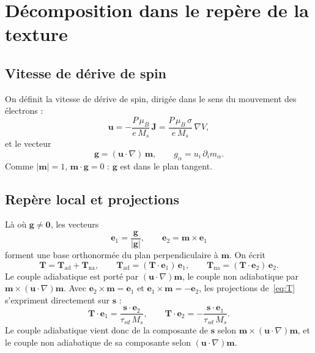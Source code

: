 \documentclass[11pt,a4paper]{article}
\newcommand{\vm}{\bm{m}}
\newcommand{\vs}{\bm{s}}
\newcommand{\vu}{\bm{u}}
\newcommand{\vg}{\bm{g}}
\newcommand{\vJ}{\bm{J}}
\newcommand{\vT}{\bm{T}}
\newcommand{\ve}{\bm{e}}
\begin{document}
\section{Décomposition dans le repère de la texture}

\subsection{Vitesse de dérive de spin}

On définit la vitesse de dérive de spin, dirigée dans le sens du mouvement des électrons :
\begin{equation}
  \vu = -\frac{P\,\mu_B}{e\,M_s}\,\vJ = \frac{P\,\mu_B\,\sigma}{e\,M_s}\,\nabla V ,
  \label{eq:u}
\end{equation}
et le vecteur
\begin{equation}
  \vg = (\vu\cdot\nabla)\,\vm ,\qquad g_\alpha = u_i\,\partial_i m_\alpha .
\end{equation}
Comme $|\vm|=1$, $\vm\cdot\vg = 0$ : $\vg$ est dans le plan tangent.

\subsection{Repère local et projections}

Là où $\vg\neq\bm{0}$, les vecteurs
\begin{equation}
  \ve_1 = \frac{\vg}{|\vg|},\qquad \ve_2 = \vm\times\ve_1
\end{equation}
forment une base orthonormée du plan perpendiculaire à $\vm$. On écrit
\begin{equation}
  \vT = \vT_{\text{ad}} + \vT_{\text{na}},\qquad
  \vT_{\text{ad}} = (\vT\cdot\ve_1)\,\ve_1,\qquad
  \vT_{\text{na}} = (\vT\cdot\ve_2)\,\ve_2 .
  \label{eq:decomp}
\end{equation}
Le couple adiabatique est porté par $(\vu\cdot\nabla)\vm$, le couple non adiabatique par
$\vm\times(\vu\cdot\nabla)\vm$. Avec $\ve_2\times\vm = \ve_1$ et $\ve_1\times\vm = -\ve_2$, les
projections de~\eqref{eq:T} s'expriment directement sur $\vs$ :
\begin{equation}
  \vT\cdot\ve_1 = \frac{\vs\cdot\ve_2}{\tau_{sd}\,M_s},\qquad
  \vT\cdot\ve_2 = -\frac{\vs\cdot\ve_1}{\tau_{sd}\,M_s}.
  \label{eq:proj}
\end{equation}
Le couple adiabatique vient donc de la composante de $\vs$ selon $\vm\times(\vu\cdot\nabla)\vm$,
et le couple non adiabatique de sa composante selon $(\vu\cdot\nabla)\vm$.
\end{document}

